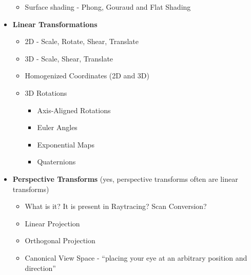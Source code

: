 \documentclass[8pt]{article}
\begin{document}
\begin{itemize}
\begin{itemize}
        \item Surface shading - Phong, Gouraud and Flat Shading
        
    \end{itemize}
    
    \item \textbf{Linear Transformations}
    
    \begin{itemize}
        
        \item 2D - Scale, Rotate, Shear, Translate
        
        \item 3D - Scale, Shear, Translate
        
        \item Homogenized Coordinates (2D and 3D)
        
        \item 3D Rotations
        
        \begin{itemize}
            
            \item Axis-Aligned Rotations
            
            \item Euler Angles
            
            \item Exponential Maps
            
            \item Quaternions
            
        \end{itemize}
        
    \end{itemize}
    
    \item \textbf{Perspective Transforms} (yes, perspective transforms often are linear transforms)
    
    \begin{itemize}
     
        \item What is it? It is present in Raytracing? Scan Conversion?
        
        \item Linear Projection
        
        \item Orthogonal Projection
        
        \item Canonical View Space - ``placing your eye at an arbitrary position and direction''
        

\end{itemize}
\end{itemize}
\end{document}
